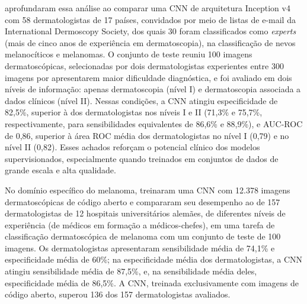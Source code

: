  aprofundaram essa análise ao comparar uma CNN de arquitetura Inception v4 com 58 dermatologistas de 17 países, convidados por meio de listas de e-mail da International Dermoscopy Society, dos quais 30 foram classificados como \textit{experts} (mais de cinco anos de experiência em dermatoscopia), na classificação de nevos melanocíticos e melanomas. O conjunto de teste reuniu 100 imagens dermatoscópicas, selecionadas por dois dermatologistas experientes entre 300 imagens por apresentarem maior dificuldade diagnóstica, e foi avaliado em dois níveis de informação: apenas dermatoscopia (nível I) e dermatoscopia associada a dados clínicos (nível II). Nessas condições, a CNN atingiu especificidade de 82,5\%, superior à dos dermatologistas nos níveis I e II (71,3\% e 75,7\%, respectivamente, para sensibilidades equivalentes de 86,6\% e 88,9\%), e AUC-ROC de 0,86, superior à área ROC média dos dermatologistas no nível I (0,79) e no nível II (0,82). Esses achados reforçam o potencial clínico dos modelos supervisionados, especialmente quando treinados em conjuntos de dados de grande escala e alta qualidade.

No domínio específico do melanoma,  treinaram uma CNN com 12.378 imagens dermatoscópicas de código aberto e compararam seu desempenho ao de 157 dermatologistas de 12 hospitais universitários alemães, de diferentes níveis de experiência (de médicos em formação a médicos-chefes), em uma tarefa de classificação dermatoscópica de melanoma com um conjunto de teste de 100 imagens. Os dermatologistas apresentaram sensibilidade média de 74,1\% e especificidade média de 60\%; na especificidade média dos dermatologistas, a CNN atingiu sensibilidade média de 87,5\%, e, na sensibilidade média deles, especificidade média de 86,5\%. A CNN, treinada exclusivamente com imagens de código aberto, superou 136 dos 157 dermatologistas avaliados.

